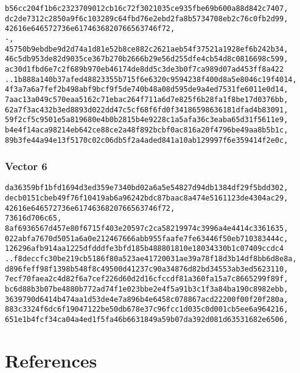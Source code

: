 \documentclass[
]{article}
\begin{document}
\begin{verbatim}
b56cc204f1b6c2323709012cb16c72f3021035ce935fbe69b600a88d842c7407,
dc2de7312c2850a9f6c103289c64fbd76e2ebd2fa8b5734708eb2c76c0fb2d99,
42616e646572736e6174636820766563746f72,
-,
45750b9ebdbe9d2d74a1d81e52b8ce882c2621aeb54f37521a1928ef6b242b34,
46c5db953de82d9035ce367b270b2666b29e56d255dfe4cb54d8c0816698c599,
ac30d1fbd6e7c2f689b970eb46174de8dd5c3de3b0f7ca989d07ad453ff8a422
..1b888a140b37afed48823355b715f6e6320c9594238f400d8a5e8046c19f4014,
4f3a7a6a7fef2b498abf9bcf9f5de740b48a08d595de9a4ed7531fe6011e0d14,
7aac13a049c570eaa5162c71ebac264f711a6d7e825f6b28fa1f8be17d0376bb,
62a7f3ac432b3ed8893d022dd47c5cf68f6fd0f34186598636181dfad4b83091,
59f2cf5c9501e5a819680e4b0b2815b4e9228c1a5afa36c3eaba65d31f5611e9,
b4e4f14aca98214eb642ce88ce2a48f892bcbf0ac816a20f4796be49aa8b5b1c,
89b3fe44a94e13f5170c02c06db5f2a4aded841a10ab129997f6e359414f2e0c,
\end{verbatim}

\hypertarget{vector-6-1}{%
\subsubsection{Vector 6}\label{vector-6-1}}

\begin{verbatim}
da36359bf1bfd1694d3ed359e7340bd02a6a5e54827d94db1384df29f5bdd302,
decb0151cbeb49f76f10419ab6a96242bdc87baac8a474e5161123de4304ac29,
42616e646572736e6174636820766563746f72,
73616d706c65,
8af6936567d457e80f6715f403e20597c2ca58219974c3996a4e4414c3361635,
022abfa7670d5051a6a0e212467666abb955faafe7fe63446f50eb710383444c,
126296afb914aa1225dfdddfe3bfd185b488801810e18034330b1c07409ccdc4
..f8deccfc30be219cb5186f80a523ae41720031ae39a78f18d3b14df8bb6d8e8a,
d896feff98f1398b548f8c49500d41237c90a34876d82bd34553ab3ed5623110,
7ecf70faea2c4d82f6a7cef226d60d2d16cfccdf81a360fa15a7c8665299f89f,
bc6d88b3b07be4880b772ad74f1e023bbe2e4f5a91b3c1f3a84ba190c8982ebb,
3639790d6414b474aa1d53de4e7a896b4e6458c078867acd22200f00f20f280a,
883c3324f6dc6f19047122be50db678e37c96fcc1d035c0d001cb5ee6a964216,
651e1b4fcf34ca04a4ed1f5fa46b6631849a59b07da392d081d63531682e6506,
\end{verbatim}

\hypertarget{references}{%
\section*{References}\label{references}}
\end{document}
